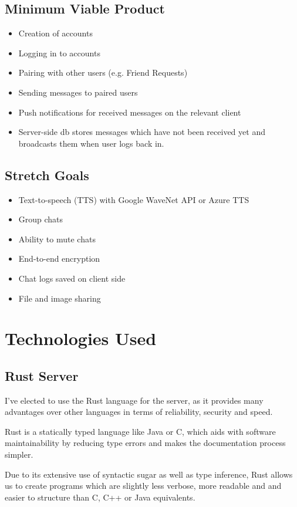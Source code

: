 \documentclass{mproj}
\begin{document}
\subsection{Minimum Viable Product}
\begin{itemize}
    \item Creation of accounts
    \item Logging in to accounts
    \item Pairing with other users (e.g. Friend Requests)
    \item Sending messages to paired users
    \item Push notifications for received messages on the relevant client
    \item Server-side db stores messages which have not been received yet and broadcasts them when user logs back in.
\end{itemize}
\subsection{Stretch Goals}
\begin{itemize}
    \item Text-to-speech (TTS) with Google WaveNet API or Azure TTS
    \item Group chats
    \item Ability to mute chats
    \item End-to-end encryption
    \item Chat logs saved on client side
    \item File and image sharing
\end{itemize}
\section{Technologies Used}
\subsection{Rust Server}
I've elected to use the Rust language\cite{matsakis2014rust} for the server, as it provides many advantages over other languages in terms of reliability, security and speed.

Rust is a statically typed language like Java or C, which aids with software maintainability by reducing type errors and makes the documentation process simpler\cite{hanenberg2014empirical}. 

Due to its extensive use of syntactic sugar \cite{pombrio2014resugaring} as well as type inference, Rust allows us to create programs which are slightly less verbose, more readable and and easier to structure than C, C++ or Java equivalents\cite{ardito2021evaluation}.
\end{document}
